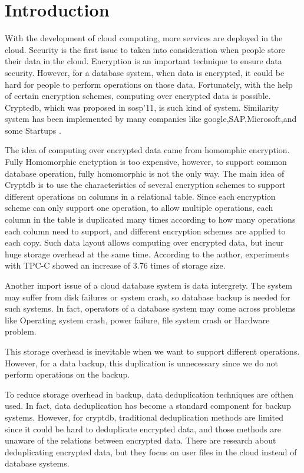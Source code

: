 \section{Introduction}


With the development of cloud computing, more services are deployed in the cloud. Security is the first issue to taken into consideration when people store their data in the cloud. Encryption is an important technique to ensure data security. However, for a database system, when data is encrypted, it could be hard for people to perform operations on those data. Fortunately, with the help of certain encryption schemes, computing over encrypted data is possible. Cryptedb\citep{popa2011cryptdb}, which was proposed in sosp'11, is such kind of system. Similarity system has been implemented by many companies like google,SAP,Microsoft,and some Startups\citep{cryptdbsite} \citep{kerschbaum2013encrypted}.


The idea of computing over encrypted data came from homomphic encryption. Fully Homomorphic enctyption is too expensive\citep{gentry2009fully}, however, to support common database operation, fully homomorphic is not the only way. The main idea of Cryptdb is to use the characteristics of several encryption schemes to support different operations on columns in a relational table.  Since each encryption scheme can only support one operation, to allow multiple operations, each column in the table is duplicated many times according to how many operations each column need to support, and different encryption schemes are applied to each copy. Such data layout allows computing over encrypted data, but incur huge storage overhead at the same time. According to the author\citep{popa2011cryptdb}, experiments with TPC-C showed an increase of 3.76 times of storage size.

Another import issue of a cloud database system is data intergrety. The system may suffer from disk failures or system crash, so database backup is needed for such systems. In fact, operators of a database system may come across problems like Operating system crash, power failure, file system crash or Hardware problem\citep{mysqlbackupdocumentation}.


This storage overhead is inevitable when we want to support different operations. However, for a data backup, this duplication is unnecessary since we do not perform operations on the backup.

To reduce storage overhead in backup, data deduplication techniques are ofthen used. In fact, data deduplication has become a standard component for backup systems\citep{fu2015design}. However, for cryptdb, traditional deduplication methods are limited since it could be hard to deduplicate encrypted data, and those methods are unaware of the relations between encrypted data. There are research about deduplicating encrypted data, but they focus on user files in the cloud instead of database systems. 

